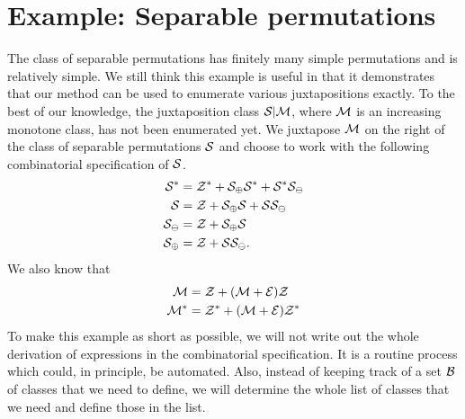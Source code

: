 \documentclass[12pt, a4paper, twoside]{report}
\begin{document}
\section{Example: Separable permutations}
\label{sec:example_sepav21}
The class of separable permutations has finitely many simple permutations and is relatively simple. We still think this example is useful in that it demonstrates that our method can be used to enumerate various juxtapositions exactly. To the best of our knowledge, the juxtaposition class $\S|\M$, where $\M$ is an increasing monotone class, has not been enumerated yet. We juxtapose $\M$ on the right of the class of separable permutations $\S$ and choose to work with the following combinatorial specification of $\S$.
\begin{align}
  \begin{aligned}
    \S^* &= \Z^* + \S_{\oplus}\S^* + \S^*\S_{\ominus}\\
    \S &= \Z + \S_{\oplus}\S + \S\S_{\ominus}\\
    \S_{\ominus} &= \Z + \S_\oplus\S\\
    \S_\oplus &= \Z + \S\S_\ominus.
    \label{eq:sepav21_sep}
  \end{aligned}
\end{align}
We also know that
\begin{align}
  \begin{aligned}
    \M &= \Z + (\M+\EE)\Z\\
    \Mstar &= \Zstar + (\M+\EE)\Zstar
  \end{aligned}
\end{align}
To make this example as short as possible, we will not write out the whole derivation of expressions in the combinatorial specification. It is a routine process which could, in principle, be automated. Also, instead of keeping track of a set $\B$ of classes that we need to define, we will determine the whole list of classes that we need and define those in the list.
\end{document}
